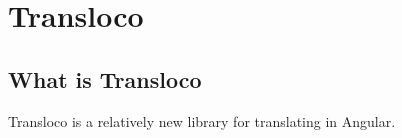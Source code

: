 \chapter{ Transloco }

\section{ What is Transloco }
Transloco is a relatively new library for translating in Angular. 